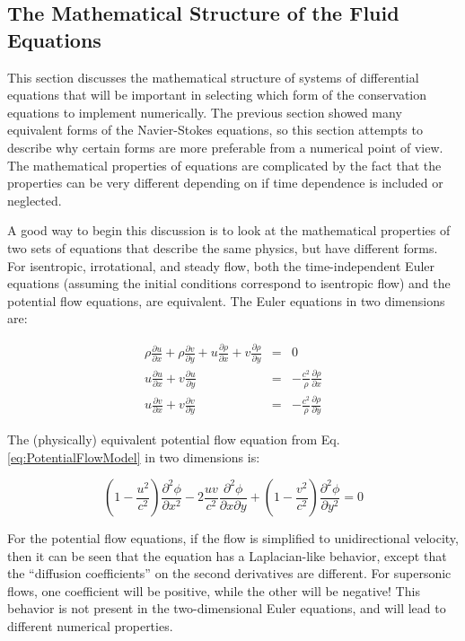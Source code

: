 \documentclass[10pt]{article}
\newcommand{\beq}{\begin{equation}}
\newcommand{\eeq}{\end{equation}}
\begin{document}
\begin{flushleft}
\section{The Mathematical Structure of the Fluid Equations}
This section discusses the mathematical structure of systems of differential equations that will be important in selecting which form of the conservation equations to implement numerically. The previous section showed many equivalent forms of the Navier-Stokes equations, so this section attempts to describe why certain forms are more preferable from a numerical point of view. The mathematical properties of equations are complicated by the fact that the properties can be very different depending on if time dependence is included or neglected. 

A good way to begin this discussion is to look at the mathematical properties of two sets of equations that describe the same physics, but have different forms. For isentropic, irrotational, and steady flow, both the time-independent Euler equations (assuming the initial conditions correspond to isentropic flow) and the potential flow equations, are equivalent. The Euler equations in two dimensions are:

\begin{subequations}
\label{eq:2DEuler}
\begin{eqnarray}
\rho\frac{\partial u}{\partial x}+\rho\frac{\partial v}{\partial y}+u\frac{\partial\rho}{\partial x}+v\frac{\partial\rho}{\partial y}&=&0\\
u\frac{\partial u}{\partial x}+v\frac{\partial u}{\partial y}&=&-\frac{c^2}{\rho}\frac{\partial\rho}{\partial x}\\
u\frac{\partial v}{\partial x}+v\frac{\partial v}{\partial y}&=&-\frac{c^2}{\rho}\frac{\partial\rho}{\partial y}
\end{eqnarray}
\end{subequations}

The (physically) equivalent potential flow equation from Eq. \eqref{eq:PotentialFlowModel} in two dimensions is:

\beq
\left(1-\frac{u^2}{c^2}\right)\frac{\partial^2\phi}{\partial x^2}-2\frac{uv}{c^2}\frac{\partial^2\phi}{\partial x\partial y}+\left(1-\frac{v^2}{c^2}\right)\frac{\partial^2\phi}{\partial y^2}=0
\eeq

For the potential flow equations, if the flow is simplified to unidirectional velocity, then it can be seen that the equation has a Laplacian-like behavior, except that the ``diffusion coefficients'' on the second derivatives are different. For supersonic flows, one coefficient will be positive, while the other will be negative! This behavior is not present in the two-dimensional Euler equations, and will lead to different numerical properties.


\end{flushleft}
\end{document}
